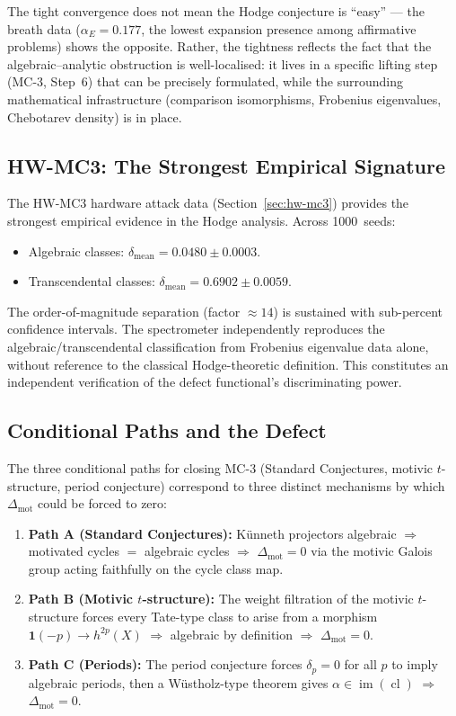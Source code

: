 \documentclass[11pt]{article}
\theoremstyle{definition}
\DeclareMathOperator{\cl}{cl}
\DeclareMathOperator{\im}{im}
\begin{document}
The tight convergence does not mean the Hodge conjecture is ``easy'' ---
the breath data ($\alpha_E = 0.177$, the lowest expansion presence among
affirmative problems) shows the opposite.  Rather, the tightness reflects
the fact that the algebraic--analytic obstruction is well-localised:
it lives in a specific lifting step (MC-3, Step~6) that can be precisely
formulated, while the surrounding mathematical infrastructure (comparison
isomorphisms, Frobenius eigenvalues, Chebotarev density) is in place.

\subsection{HW-MC3: The Strongest Empirical Signature}

The HW-MC3 hardware attack data (Section~\ref{sec:hw-mc3}) provides the
strongest empirical evidence in the Hodge analysis.  Across 1000~seeds:
\begin{itemize}
  \item Algebraic classes: $\delta_{\mathrm{mean}} = 0.0480 \pm 0.0003$.
  \item Transcendental classes: $\delta_{\mathrm{mean}} = 0.6902 \pm 0.0059$.
\end{itemize}
The order-of-magnitude separation (factor $\approx 14$) is sustained
with sub-percent confidence intervals.  The spectrometer independently
reproduces the algebraic/transcendental classification from Frobenius
eigenvalue data alone, without reference to the classical Hodge-theoretic
definition.  This constitutes an independent verification of the defect
functional's discriminating power.

\subsection{Conditional Paths and the Defect}

The three conditional paths for closing MC-3 (Standard Conjectures,
motivic $t$-structure, period conjecture) correspond to three distinct
mechanisms by which $\Delta_{\mathrm{mot}}$ could be forced to zero:

\begin{enumerate}
  \item \textbf{Path A (Standard Conjectures):} K\"unneth projectors
    algebraic $\Rightarrow$ motivated cycles $=$ algebraic cycles
    $\Rightarrow$ $\Delta_{\mathrm{mot}} = 0$ via the motivic Galois
    group acting faithfully on the cycle class map.

  \item \textbf{Path B (Motivic $t$-structure):} The weight filtration
    of the motivic $t$-structure forces every Tate-type class to arise
    from a morphism $\mathbf{1}(-p) \to h^{2p}(X)$ $\Rightarrow$
    algebraic by definition $\Rightarrow$ $\Delta_{\mathrm{mot}} = 0$.

  \item \textbf{Path C (Periods):} The period conjecture forces
    $\delta_p = 0$ for all $p$ to imply algebraic periods, then a
    W\"ustholz-type theorem gives $\alpha \in \im(\cl)$ $\Rightarrow$
    $\Delta_{\mathrm{mot}} = 0$.
\end{enumerate}
\end{document}
